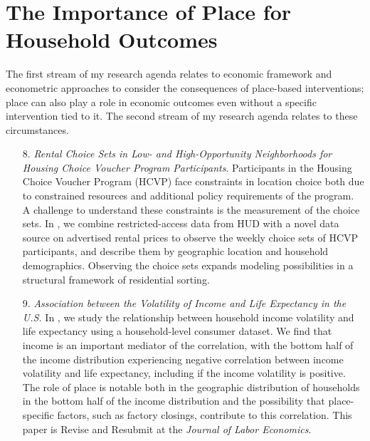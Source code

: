 \section{The Importance of Place for Household Outcomes}


The first stream of my research agenda relates to economic framework and econometric approaches to consider the consequences of place-based interventions; place can also play a role in economic outcomes even without a specific intervention tied to it. The second stream of my research agenda relates to these circumstances.

\begin{enumerate}

\item[8.] \textit{Rental Choice Sets in Low- and High-Opportunity Neighborhoods for Housing Choice Voucher Program Participants}. Participants in the Housing Choice Voucher Program (HCVP) face constraints in location choice both due to constrained resources and additional policy requirements of the program. A challenge to understand these constraints is the measurement of the choice sets. In \citet{park_rental_2023}, we combine restricted-access data from HUD with a novel data source on advertised rental prices to observe the weekly choice sets of HCVP participants, and describe them by geographic location and household demographics. Observing the choice sets expands modeling possibilities in a structural framework of residential sorting.


\item[9.] \textit{Association between the Volatility of Income and Life Expectancy in the U.S.} In \citet{ziff_association_2023}, we study the relationship between household income volatility and life expectancy using a household-level consumer dataset. We find that income is an important mediator of the correlation, with the bottom half of the income distribution experiencing negative correlation between income volatility and life expectancy, including if the income volatility is positive. The role of place is notable both in the geographic distribution of households in the bottom half of the income distribution and the possibility that place-specific factors, such as factory closings, contribute to this correlation. This paper is Revise and Resubmit at the \textit{Journal of Labor Economics}.


\end{enumerate}

\singlespacing






